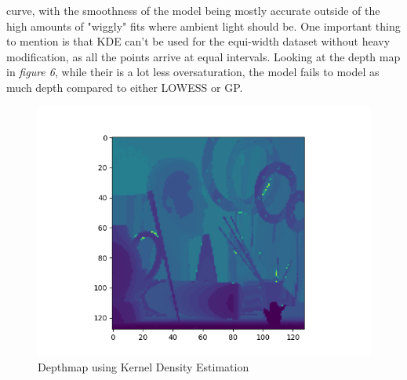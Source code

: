 \documentclass[letterpaper,12pt]{article}
\begin{document}
curve, with the smoothness of the model being mostly accurate outside of the high amounts
of "wiggly" fits where ambient light should be. One important thing to mention is that 
KDE can't be used for the equi-width dataset without heavy modification, as all the points
arrive at equal intervals. Looking at the depth map in \emph{figure 6}, while their is a lot
less oversaturation, the model fails to model as much depth compared to either LOWESS or GP.
\begin{figure}[H]
\centering
\includegraphics{kde_depthmap}
\caption{Depthmap using Kernel Density Estimation}
\end{figure}
\end{document}
